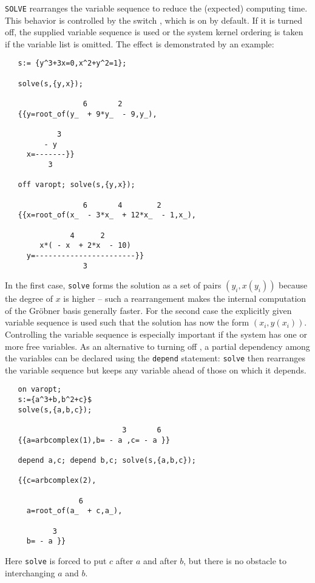 \hypertarget{switch:VAROPT}{}
\texttt{SOLVE} rearranges the variable sequence
to reduce the (expected) computing time. This behavior is controlled
by the switch , which is on by default.
If it is turned off, the supplied variable sequence is used
or the system kernel ordering is taken if the variable
list is omitted. The effect is demonstrated by an example:
\begin{verbatim}
   s:= {y^3+3x=0,x^2+y^2=1};

   solve(s,{y,x});

                  6       2
   {{y=root_of(y_  + 9*y_  - 9,y_),

            3
         - y
     x=-------}}
          3

   off varopt; solve(s,{y,x});

                  6       4        2
   {{x=root_of(x_  - 3*x_  + 12*x_  - 1,x_),

               4      2
        x*( - x  + 2*x  - 10)
     y=-----------------------}}
                  3

\end{verbatim}
In the first case, \texttt{solve} forms the solution as a set of
pairs $(y_i,x(y_i))$ because the degree of $x$ is higher --
such a rearrangement makes the internal computation of the Gr\"obner basis
generally faster. For the second case the explicitly given variable sequence
is used such that the solution has now the form $(x_i,y(x_i))$.
Controlling the variable sequence is especially important if
the system has one or more free variables.
As an alternative to turning off , a partial dependency among
the variables can be declared using the \texttt{depend}
statement: \texttt{solve} then rearranges the variable sequence but keeps any
variable ahead of those on which it depends.
\begin{verbatim}
   on varopt;
   s:={a^3+b,b^2+c}$
   solve(s,{a,b,c});

                           3       6
   {{a=arbcomplex(1),b= - a ,c= - a }}

   depend a,c; depend b,c; solve(s,{a,b,c});

   {{c=arbcomplex(2),

                 6
     a=root_of(a_  + c,a_),

           3
     b= - a }}
\end{verbatim}
Here \texttt{solve} is forced to put $c$ after $a$ and after $b$, but
there is no obstacle to interchanging $a$ and $b$.
